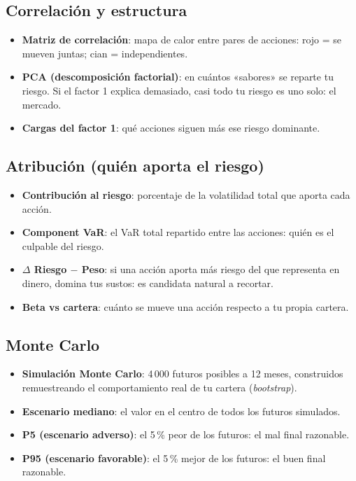 \documentclass[11pt,a4paper]{article}
\newcommand{\dato}[2]{\item \textbf{#1}: #2}
\begin{document}
\subsection{Correlación y estructura}
\begin{itemize}
  \dato{Matriz de correlación}{mapa de calor entre pares de acciones: rojo = se mueven juntas; cian = independientes.}
  \dato{PCA (descomposición factorial)}{en cuántos «sabores» se reparte tu riesgo. Si el factor 1 explica demasiado, casi todo tu riesgo es uno solo: el mercado.}
  \dato{Cargas del factor 1}{qué acciones siguen más ese riesgo dominante.}
\end{itemize}

\subsection{Atribución (quién aporta el riesgo)}
\begin{itemize}
  \dato{Contribución al riesgo}{porcentaje de la volatilidad total que aporta cada acción.}
  \dato{Component VaR}{el VaR total repartido entre las acciones: quién es el culpable del riesgo.}
  \dato{$\Delta$ Riesgo $-$ Peso}{si una acción aporta más riesgo del que representa en dinero, domina tus sustos: es candidata natural a recortar.}
  \dato{Beta vs cartera}{cuánto se mueve una acción respecto a tu propia cartera.}
\end{itemize}

\subsection{Monte Carlo}
\begin{itemize}
  \dato{Simulación Monte Carlo}{4\,000 futuros posibles a 12 meses, construidos remuestreando el comportamiento real de tu cartera (\emph{bootstrap}).}
  \dato{Escenario mediano}{el valor en el centro de todos los futuros simulados.}
  \dato{P5 (escenario adverso)}{el 5\,\% peor de los futuros: el mal final razonable.}
  \dato{P95 (escenario favorable)}{el 5\,\% mejor de los futuros: el buen final razonable.}
\end{itemize}

\end{document}
